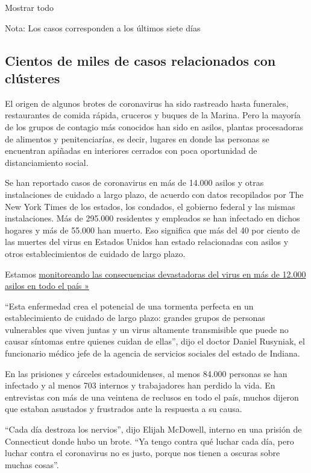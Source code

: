 Mostrar todo

Nota: Los casos corresponden a los últimos siete días

\hypertarget{cientos-de-miles-de-casos-relacionados-con-cluxfasteres}{%
\subsection{Cientos de miles de casos relacionados con
clústeres}\label{cientos-de-miles-de-casos-relacionados-con-cluxfasteres}}

El origen de algunos brotes de coronavirus ha sido rastreado hasta
funerales, restaurantes de comida rápida, cruceros y buques de la
Marina. Pero la mayoría de los grupos de contagio más conocidos han sido
en asilos, plantas procesadoras de alimentos y penitenciarías, es decir,
lugares en donde las personas se encuentran apiñadas en interiores
cerrados con poca oportunidad de distanciamiento social.

Se han reportado casos de coronavirus en más de 14.000 asilos y otras
instalaciones de cuidado a largo plazo, de acuerdo con datos recopilados
por The New York Times de los estados, los condados, el gobierno federal
y las mismas instalaciones. Más de 295.000 residentes y empleados se han
infectado en dichos hogares y más de 55.000 han muerto. Eso significa
que más del 40 por ciento de las muertes del virus en Estados Unidos han
estado relacionadas con asilos y otros establecimientos de cuidado de
largo plazo.

Estamos
\href{https://www.nytimes.com/interactive/2020/us/coronavirus-nursing-homes.html}{monitoreando
las consecuencias devastadoras del virus en más de 12.000 asilos en todo
el país »}

``Esta enfermedad crea el potencial de una tormenta perfecta en un
establecimiento de cuidado de largo plazo: grandes grupos de personas
vulnerables que viven juntas y un virus altamente transmisible que puede
no causar síntomas entre quienes cuidan de ellas'', dijo el doctor
Daniel Rusyniak, el funcionario médico jefe de la agencia de servicios
sociales del estado de Indiana.

En las prisiones y cárceles estadounidenses, al menos 84.000 personas se
han infectado y al menos 703 internos y trabajadores han perdido la
vida. En entrevistas con más de una veintena de reclusos en todo el
país, muchos dijeron que estaban asustados y frustrados ante la
respuesta a su causa.

``Cada día destroza los nervios'', dijo Elijah McDowell, interno en una
prisión de Connecticut donde hubo un brote. ``Ya tengo contra qué luchar
cada día, pero luchar contra el coronavirus no es justo, porque nos
tienen a oscuras sobre muchas cosas''.

